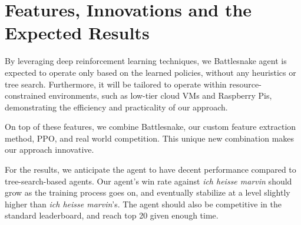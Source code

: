 \documentclass[a4paper]{article}
\newcommand{\instruction}[1]{\textcolor{orange}{#1}}
\renewcommand{\instruction}[1]{} %
\begin{document}
\section{Features, Innovations and the Expected Results}

By leveraging deep reinforcement learning techniques,
we Battlesnake agent is expected to operate only based on the learned policies,
without any heuristics or tree search.
Furthermore, it will be tailored to operate within resource-constrained
environments, such as low-tier cloud VMs and Raspberry Pis,
demonstrating the efficiency and practicality of our approach.

On top of these features, we combine Battlesnake,
our custom feature extraction method, PPO, and real world competition.
This unique new combination makes our approach innovative.

For the results,
we anticipate the agent to have decent performance compared to tree-search-based
agents. Our agent's win rate against \emph{ich heisse marvin}
should grow as the training process goes on,
and eventually stabilize at a level slightly higher than \emph{ich heisse
marvin}'s. The agent should also be competitive in the standard leaderboard,
and reach top 20 given enough time.

\instruction{
    PENALTY FOR PLAGIARISM:\\
    \(\geq 30\%\): ZERO SCORE for the report.\\
    \((25\%,30\%\): -1.5 points\\
    \((20\%,\ 25\%\): -1.0 points\\
    (15\%, 20\%]: -0.5 points\\
    \(\leq 15\%\): no penalty, you will get 2 points
}

\printbibliography
\end{document}
